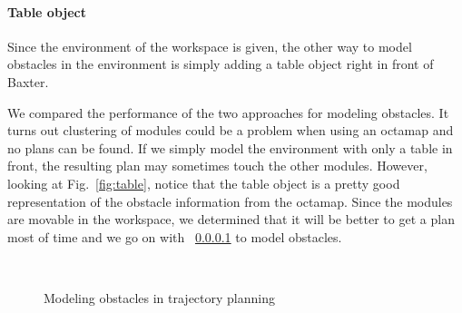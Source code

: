 \paragraph{Table object}\label{obstacle-table}
Since the environment of the workspace is given, the other way to model obstacles in the environment is simply adding a table object right in front of Baxter. 

We compared the performance of the two approaches for modeling obstacles. It turns out clustering of modules could be a problem when using an octamap and no plans can be found. If we simply model the environment with only a table in front, the resulting plan may sometimes touch the other modules. However, looking at Fig.~\ref{fig:table}, notice that the table object is a pretty good representation of the obstacle information from the octamap. Since the modules are movable in the workspace, we determined that it will be better to get a plan most of time and we go on with ~\ref{obstacle-table} to model obstacles. 

\begin{figure}[ht!]%
\centering
{}\hspace{0.1cm}
\hspace{0.1cm}
\\
\caption{Modeling obstacles in trajectory planning}
\end{figure}



